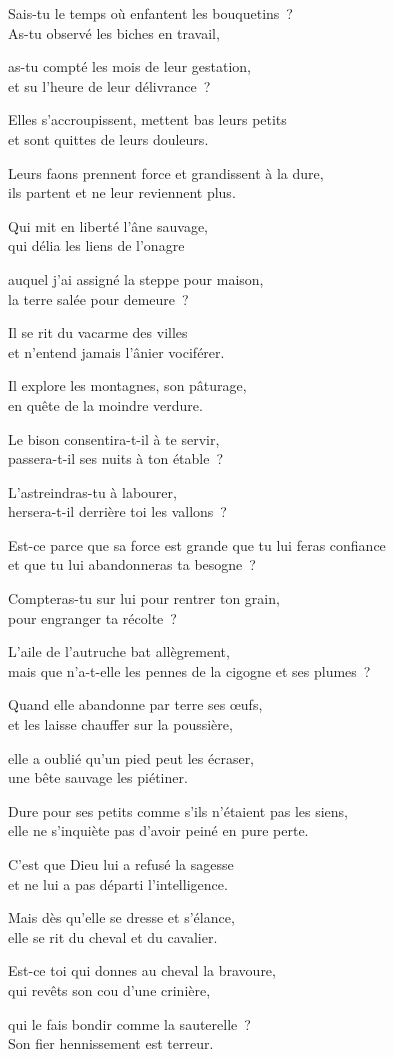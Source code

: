 \documentclass[twoside]{book} %
\newcommand{\lnatt}[1]{\reversemarginpar\marginpar[\sffamily\scriptsize #1]{}}
\newcommand{\lpar}[1]{\noindent\hangindent=2\parindent  #1\par} %
\newcommand\chaptercont{} %
\renewcommand{\lnatt}[1]{\marginpar{\sffamily\scriptsize #1}}
\begin{document}
\chaptercont
\lpar{Sais-tu le temps où enfantent les bouquetins ? \\
As-tu observé les biches en travail,}
\lpar{as-tu compté les mois de leur gestation, \\
et su l’heure de leur délivrance ?}
\lpar{Elles s’accroupissent, mettent bas leurs petits \\
et sont quittes de leurs douleurs.}
\lpar{Leurs faons prennent force et grandissent à la dure, \\
ils partent et ne leur reviennent plus.}
\bigskip
\lpar{\lnatt{5}Qui mit en liberté l’âne sauvage, \\
qui délia les liens de l’onagre}
\lpar{auquel j’ai assigné la steppe pour maison, \\
la terre salée pour demeure ?}
\lpar{Il se rit du vacarme des villes \\
et n’entend jamais l’ânier vociférer.}
\lpar{Il explore les montagnes, son pâturage, \\
en quête de la moindre verdure.}
\bigskip
\lpar{Le bison consentira-t-il à te servir, \\
passera-t-il ses nuits à ton étable ?}
\lpar{\lnatt{10}L’astreindras-tu à labourer, \\
hersera-t-il derrière toi les vallons ?}
\lpar{Est-ce parce que sa force est grande que tu lui feras confiance \\
et que tu lui abandonneras ta besogne ?}
\lpar{Compteras-tu sur lui pour rentrer ton grain, \\
pour engranger ta récolte ?}
\bigskip
\lpar{L’aile de l’autruche bat allègrement, \\
mais que n’a-t-elle les pennes de la cigogne et ses plumes ?}
\lpar{Quand elle abandonne par terre ses œufs, \\
et les laisse chauffer sur la poussière,}
\lpar{\lnatt{15}elle a oublié qu’un pied peut les écraser, \\
une bête sauvage les piétiner.}
\lpar{Dure pour ses petits comme s’ils n’étaient pas les siens, \\
elle ne s’inquiète pas d’avoir peiné en pure perte.}
\lpar{C’est que Dieu lui a refusé la sagesse \\
et ne lui a pas départi l’intelligence.}
\lpar{Mais dès qu’elle se dresse et s’élance, \\
elle se rit du cheval et du cavalier.}
\bigskip
\lpar{Est-ce toi qui donnes au cheval la bravoure, \\
qui revêts son cou d’une crinière,}
\lpar{\lnatt{20}qui le fais bondir comme la sauterelle ? \\
Son fier hennissement est terreur.}
\end{document}
